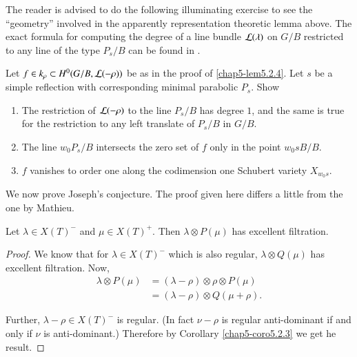 The reader is advised to do the following illuminating exercise to see
the ``geometry'' involved in the apparently representation theoretic
lemma above. The exact formula for computing the degree of a line
bundle $\mathcal{L}(\lambda)$ on $G/B$ restricted to any line of the type
$P_{s}/B$ can be found in \cite{key3}.

\begin{exercise}\label{chap5-exer5.2.5}
Let $f\in k_{\rho}\subset H^{0}(G/B,\mathcal{L}(-\rho))$ be as in the proof of
\ref{chap5-lem5.2.4}. Let $s$ be a simple reflection with
corresponding minimal parabolic $P_{s}$. Show
\begin{enumerate}
\renewcommand{\theenumi}{\roman{enumi}}
\renewcommand{\labelenumi}{(\theenumi)}
\item The restriction of $\mathcal{L}(-\rho)$ to the line $P_{s}/B$ has degree
  $1$, and the same is true for the restriction to any left translate
  of $P_{s}/B$ in $G/B$.

\item The line $w_{0}P_{s}/B$ intersects the zero set of $f$ only in
  the point $w_{0}sB/B$. 

\item $f$ vanishes to order one along the codimension one Schubert
  variety $X_{w_{0}s}$.
\end{enumerate}
\end{exercise}

We now prove Joseph's conjecture. The proof given here differs a
little from the one by Mathieu.

\begin{proposition}\label{chap5-prop5.2.6}
Let $\lambda\in X(T)^{-}$ and $\mu\in X(T)^{+}$. Then $\lambda\otimes
P(\mu)$ has excellent filtration.
\end{proposition}

\begin{proof}
We know that for $\lambda\in X(T)^{-}$ which is also regular,
$\lambda\otimes Q(\mu)$ has excellent filtration. Now,
\begin{align*}
\lambda \otimes P(\mu) &= (\lambda-\rho)\otimes \rho\otimes P(\mu)\\
&= (\lambda-\rho)\otimes Q(\mu+\rho).
\end{align*}

Further, $\lambda-\rho\in X(T)^{-}$ is regular. (In fact $\nu-\rho$ is
regular anti-dominant if and only if $\nu$ is anti-dominant.)
Therefore by Corollary \ref{chap5-coro5.2.3} we get he result.
\end{proof}

